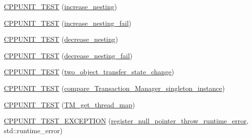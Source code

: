\begin{DoxyCompactItemize}
\item 
\hyperlink{class_my_test_c_ase_ac1ca5590a2f11b04c0021e48109f2a39_ac1ca5590a2f11b04c0021e48109f2a39}{C\+P\+P\+U\+N\+I\+T\+\_\+\+T\+E\+ST} (\hyperlink{class_my_test_c_ase_aadf771b5eefc5f32984cb6c177d217d0_aadf771b5eefc5f32984cb6c177d217d0}{increase\+\_\+nesting})
\item 
\hyperlink{class_my_test_c_ase_afca90d71ebf3e266df30e28f75b37756_afca90d71ebf3e266df30e28f75b37756}{C\+P\+P\+U\+N\+I\+T\+\_\+\+T\+E\+ST} (\hyperlink{class_my_test_c_ase_af72ca0f6e19543b2bc80f8fc5181dae7_af72ca0f6e19543b2bc80f8fc5181dae7}{increase\+\_\+nesting\+\_\+fail})
\item 
\hyperlink{class_my_test_c_ase_acef5c7ba4b93a1a85a654fefaccb4c72_acef5c7ba4b93a1a85a654fefaccb4c72}{C\+P\+P\+U\+N\+I\+T\+\_\+\+T\+E\+ST} (\hyperlink{class_my_test_c_ase_a2da7267d6799893e898032f5ae54c1e1_a2da7267d6799893e898032f5ae54c1e1}{decrease\+\_\+nesting})
\item 
\hyperlink{class_my_test_c_ase_a5ad6974a949d62985da268f0f8842420_a5ad6974a949d62985da268f0f8842420}{C\+P\+P\+U\+N\+I\+T\+\_\+\+T\+E\+ST} (\hyperlink{class_my_test_c_ase_ad2bec86c60b7992f24c4d59a00a1433b_ad2bec86c60b7992f24c4d59a00a1433b}{decrease\+\_\+nesting\+\_\+fail})
\item 
\hyperlink{class_my_test_c_ase_a74ba217b63d4a21ff11575b136bc5c67_a74ba217b63d4a21ff11575b136bc5c67}{C\+P\+P\+U\+N\+I\+T\+\_\+\+T\+E\+ST} (\hyperlink{class_my_test_c_ase_ab9c76eb2dfd565a353ae9a5f604b36d9_ab9c76eb2dfd565a353ae9a5f604b36d9}{two\+\_\+object\+\_\+transfer\+\_\+state\+\_\+change})
\item 
\hyperlink{class_my_test_c_ase_ad47d929e89186d8863484d07346d7d58_ad47d929e89186d8863484d07346d7d58}{C\+P\+P\+U\+N\+I\+T\+\_\+\+T\+E\+ST} (\hyperlink{class_my_test_c_ase_a124c2540c72219b92c477a1fbda21409_a124c2540c72219b92c477a1fbda21409}{compare\+\_\+\+Transaction\+\_\+\+Manager\+\_\+singleton\+\_\+instance})
\item 
\hyperlink{class_my_test_c_ase_a0400857ee37161bb9cf89c7a78e430cf_a0400857ee37161bb9cf89c7a78e430cf}{C\+P\+P\+U\+N\+I\+T\+\_\+\+T\+E\+ST} (\hyperlink{class_my_test_c_ase_abbb762450dffd3be8bf9d1b6ec757466_abbb762450dffd3be8bf9d1b6ec757466}{T\+M\+\_\+get\+\_\+thread\+\_\+map})
\item 
\hyperlink{class_my_test_c_ase_a83102af0b30f86266f143148ebb0b730_a83102af0b30f86266f143148ebb0b730}{C\+P\+P\+U\+N\+I\+T\+\_\+\+T\+E\+S\+T\+\_\+\+E\+X\+C\+E\+P\+T\+I\+ON} (\hyperlink{class_my_test_c_ase_a80f9123880a0b79e4119f2f4699847ec_a80f9123880a0b79e4119f2f4699847ec}{register\+\_\+null\+\_\+pointer\+\_\+throw\+\_\+runtime\+\_\+error}, std\+::runtime\+\_\+error)

\end{DoxyCompactItemize}
